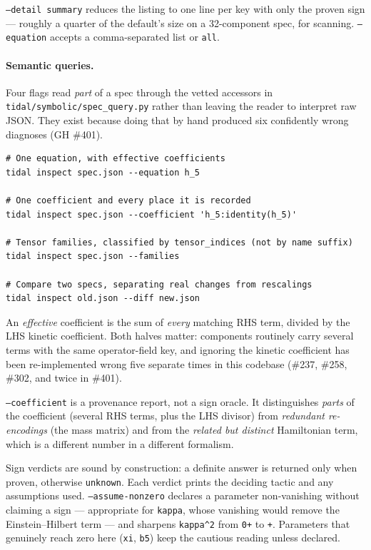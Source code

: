 \texttt{--detail summary} reduces the listing to one line per key with only the proven
sign --- roughly a quarter of the default's size on a 32-component spec, for scanning.
\texttt{--equation} accepts a comma-separated list or \texttt{all}.

\paragraph{Semantic queries.}
Four flags read \emph{part} of a spec through the vetted accessors in
\texttt{tidal/symbolic/spec\_query.py} rather than leaving the reader to
interpret raw JSON. They exist because doing that by hand produced six
confidently wrong diagnoses (GH \#401).

\begin{lstlisting}[style=bash]
# One equation, with effective coefficients
tidal inspect spec.json --equation h_5

# One coefficient and every place it is recorded
tidal inspect spec.json --coefficient 'h_5:identity(h_5)'

# Tensor families, classified by tensor_indices (not by name suffix)
tidal inspect spec.json --families

# Compare two specs, separating real changes from rescalings
tidal inspect old.json --diff new.json
\end{lstlisting}

An \emph{effective} coefficient is the sum of \emph{every} matching RHS term,
divided by the LHS kinetic coefficient. Both halves matter: components
routinely carry several terms with the same operator-field key, and ignoring
the kinetic coefficient has been re-implemented wrong five separate times in
this codebase (\#237, \#258, \#302, and twice in \#401).

\texttt{--coefficient} is a provenance report, not a sign oracle. It
distinguishes \emph{parts} of the coefficient (several RHS terms, plus the
LHS divisor) from \emph{redundant re-encodings} (the mass matrix) and from
the \emph{related but distinct} Hamiltonian term, which is a different number
in a different formalism.

Sign verdicts are sound by construction: a definite answer is returned only
when proven, otherwise \texttt{unknown}. Each verdict prints the deciding
tactic and any assumptions used. \texttt{--assume-nonzero} declares a
parameter non-vanishing without claiming a sign --- appropriate for
\texttt{kappa}, whose vanishing would remove the Einstein--Hilbert term ---
and sharpens \texttt{kappa\^{}2} from \texttt{0+} to \texttt{+}. Parameters
that genuinely reach zero here (\texttt{xi}, \texttt{b5}) keep the cautious
reading unless declared.

